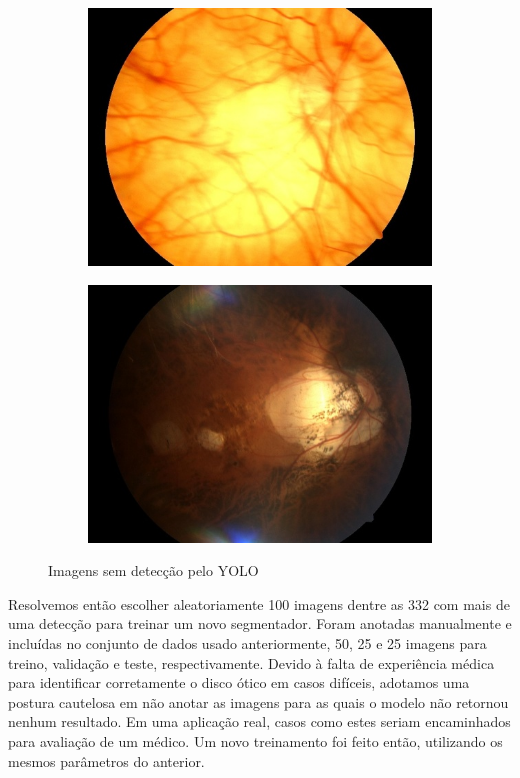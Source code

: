 \documentclass[12pt]{article}
\begin{document}
\begin{figure}
\begin{subfigure}[b]{0.47\textwidth}
        \includegraphics[width=\textwidth]{images/no_box/TRAIN046833_boxes.jpg}
        \label{fig:images_no_box_3}
    \end{subfigure}
    \hfill
    \begin{subfigure}[b]{0.47\textwidth}
        \centering
        \includegraphics[width=\textwidth]{images/no_box/TRAIN099284_boxes.jpg}
        \label{fig:images_no_box_4}
    \end{subfigure}
    \caption{Imagens sem detecção pelo YOLO}
    \label{fig:images_no_box}
\end{figure}

Resolvemos então escolher aleatoriamente 100 imagens dentre as 332 com mais de uma detecção para treinar um novo segmentador. Foram anotadas manualmente e incluídas no conjunto de dados usado anteriormente, 50, 25 e 25 imagens para treino, validação e teste, respectivamente. Devido à falta de experiência médica para identificar corretamente o disco ótico  em casos difíceis, adotamos uma postura cautelosa em não anotar as imagens para as quais o modelo não retornou nenhum resultado. Em uma aplicação real, casos como estes seriam encaminhados para avaliação de um médico. Um novo treinamento foi feito então, utilizando os mesmos parâmetros do anterior.
\end{document}
